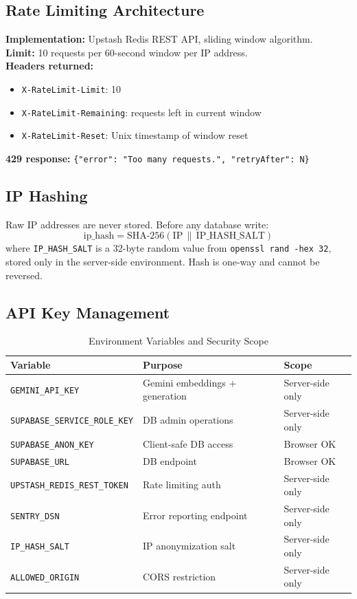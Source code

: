 \documentclass[12pt, a4paper]{article}
\begin{document}
\subsection{Rate Limiting Architecture}

\begin{secbox}
\textbf{Implementation:} Upstash Redis REST API, sliding window algorithm.\\
\textbf{Limit:} 10 requests per 60-second window per IP address.\\
\textbf{Headers returned:}
\begin{itemize}[noitemsep]
  \item \texttt{X-RateLimit-Limit}: 10
  \item \texttt{X-RateLimit-Remaining}: requests left in current window
  \item \texttt{X-RateLimit-Reset}: Unix timestamp of window reset
\end{itemize}
\textbf{429 response:} \texttt{\{"error": "Too many requests.", "retryAfter": N\}}
\end{secbox}

\subsection{IP Hashing}

Raw IP addresses are never stored. Before any database write:
$$
\text{ip\_hash} = \text{SHA-256}(\text{IP} \,\|\, \text{IP\_HASH\_SALT})
$$
where \texttt{IP\_HASH\_SALT} is a 32-byte random value from \texttt{openssl rand -hex 32},
stored only in the server-side environment. Hash is one-way and cannot be reversed.

\subsection{API Key Management}

\begin{table}[H]
  \centering
  \caption{Environment Variables and Security Scope}
  \small
  \begin{tabularx}{\textwidth}{l X l}
    \toprule
    \textbf{Variable} & \textbf{Purpose} & \textbf{Scope} \\
    \midrule
    \texttt{GEMINI\_API\_KEY} & Gemini embeddings + generation & Server-side only \\
    \texttt{SUPABASE\_SERVICE\_ROLE\_KEY} & DB admin operations & Server-side only \\
    \texttt{SUPABASE\_ANON\_KEY} & Client-safe DB access & Browser OK \\
    \texttt{SUPABASE\_URL} & DB endpoint & Browser OK \\
    \texttt{UPSTASH\_REDIS\_REST\_TOKEN} & Rate limiting auth & Server-side only \\
    \texttt{SENTRY\_DSN} & Error reporting endpoint & Server-side only \\
    \texttt{IP\_HASH\_SALT} & IP anonymization salt & Server-side only \\
    \texttt{ALLOWED\_ORIGIN} & CORS restriction & Server-side only \\
    \bottomrule
  \end{tabularx}
\end{table}
\end{document}
